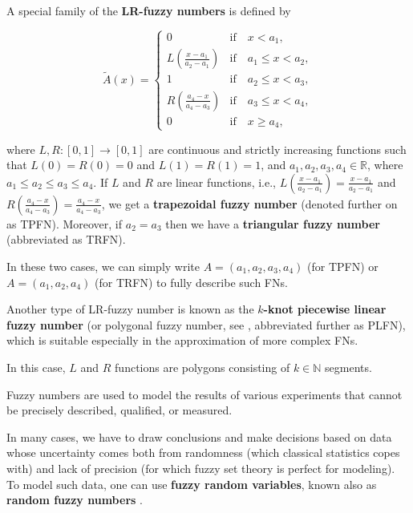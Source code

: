 A special family of the \textbf{LR-fuzzy numbers} is defined by

\begin{equation} 
\tilde{A}(x)=
\begin{cases}
0 & \text{if}\quad x < a_1,  \\
L \left( \frac{x-a_1}{a_2 - a_1}\right) & \text{if}\quad a_1 \leqslant x < a_2 ,  \\
1 & \text{if}\quad a_2 \leqslant x < a_3 , \\
R \left( \frac{a_4 - x}{a_4 - a_3}\right) & \text{if}\quad a_3 \leqslant x < a_4 , \\
0 & \text{if}\quad x \geqslant a_4,  
\end{cases}
\label{eq:LFfn}
\end{equation} 

where $L, R: [0,1] \rightarrow [0,1]$ are continuous and strictly increasing functions such that $L(0)=R(0)=0$ and $L(1)=R(1)=1$, and $a_1,a_2,a_3,a_4\in\mathbb{R}$, where $a_1\leqslant a_2\leqslant a_3\leqslant a_4$. If $L$ and $R$ are linear functions, i.e., $L \left( \frac{x-a_1}{a_2 - a_1}\right) = \frac{x-a_1}{a_2 - a_1}$ and $R \left( \frac{a_4 - x}{a_4 - a_3}\right) = \frac{a_4 - x}{a_4 - a_3}$, we get a \textbf{trapezoidal fuzzy number} (denoted further on as TPFN). Moreover, if $a_2=a_3$ then we have a \textbf{triangular fuzzy number} (abbreviated as TRFN).

In these two cases, we can simply write $A=(a_1, a_2, a_3, a_4)$ (for TPFN) or $A = (a_1, a_2, a_4)$ (for TRFN) to fully describe such FNs.

Another type of LR-fuzzy number is known as the \textbf{$k$-knot piecewise linear fuzzy number} \citep{Coroianu2019} (or polygonal fuzzy number, see \cite{Baez2012}, abbreviated further as PLFN), which is suitable especially in the approximation of more complex FNs.

In this case, $L$ and $R$ functions are polygons consisting of $k\in\mathbb{N}$ segments.

Fuzzy numbers are used to model the results of various experiments that cannot be precisely described, qualified, or measured.

In many cases, we have to draw conclusions and make decisions based on data whose uncertainty comes both from randomness (which classical statistics copes with) and lack of precision (for which fuzzy set theory is perfect for modeling). To model such data, one can use \textbf{fuzzy random variables}, known also as \textbf{random fuzzy numbers} \citep{FRV}.

